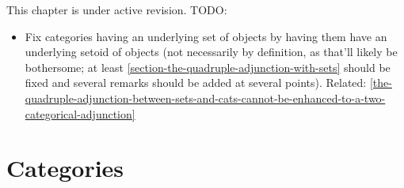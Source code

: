 This chapter is under active revision. TODO:
\begin{itemize}
    \item Fix categories having an underlying set of objects by having them have an underlying setoid of objects (not necessarily by definition, as that'll likely be bothersome; at least \cref{section-the-quadruple-adjunction-with-sets} should be fixed and several remarks should be added at several points). Related: \cref{the-quadruple-adjunction-between-sets-and-cats-cannot-be-enhanced-to-a-two-categorical-adjunction}
\end{itemize}

\ChapterTableOfContents

\section{Categories}\label{section-categories}
